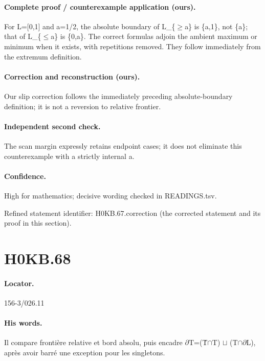 \paragraph{Complete proof / counterexample application (ours).} For L=[0,1] and a=1/2, the absolute boundary of L\_\{\ensuremath{\geq}a\} is \{a,1\}, not \{a\}; that of L\_\{\ensuremath{\leq}a\} is \{0,a\}. The correct formulas adjoin the ambient maximum or minimum when it exists, with repetitions removed. They follow immediately from the extremum definition.

\paragraph{Correction and reconstruction (ours).} Our slip correction follows the immediately preceding absolute-boundary definition; it is not a reversion to relative frontier.

\paragraph{Independent second check.} The scan margin expressly retains endpoint cases; it does not eliminate this counterexample with a strictly internal a.

\paragraph{Confidence.} High for mathematics; decisive wording checked in READINGS.tsv.

\noindent Refined statement identifier: H0KB.67.correction (the corrected statement and its proof in this section).

\section*{H0KB.68}\label{statement:H0KB.68}
\paragraph{Locator.} 156-3/026.11

\paragraph{His words.} Il compare frontière relative et bord absolu, puis encadre \ensuremath{\partial}T=(Ṫ\ensuremath{\cap}T) \ensuremath{\sqcup} (T\ensuremath{\cap}\ensuremath{\partial}L), après avoir barré une exception pour les singletons.

